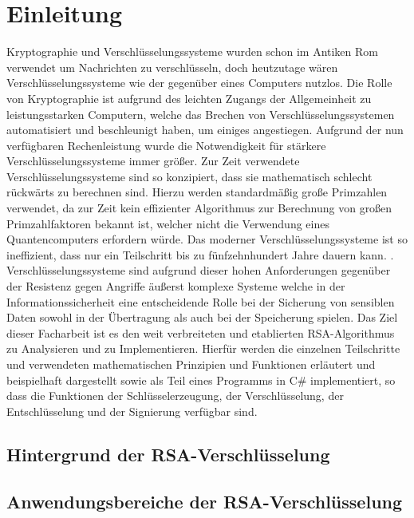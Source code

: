 \chapter{Einleitung}

Kryptographie und Verschlüsselungssysteme wurden schon im Antiken Rom verwendet um Nachrichten zu verschlüsseln\cite{aichner22}, doch heutzutage wären Verschlüsselungssysteme wie der  gegenüber eines Computers nutzlos.
Die Rolle von Kryptographie ist aufgrund des leichten Zugangs der Allgemeinheit zu leistungsstarken Computern, welche das Brechen von  Verschlüsselungssystemen automatisiert und beschleunigt haben, um einiges angestiegen.
Aufgrund der nun verfügbaren Rechenleistung wurde die Notwendigkeit für stärkere Verschlüsselungssysteme immer größer. Zur Zeit verwendete Verschlüsselungssysteme sind so konzipiert, dass sie mathematisch schlecht rückwärts zu berechnen sind.
Hierzu werden standardmäßig große Primzahlen verwendet, da zur Zeit kein effizienter Algorithmus zur Berechnung von großen Primzahlfaktoren bekannt ist, welcher nicht die Verwendung eines Quantencomputers erfordern würde.
Das  moderner Verschlüsselungssysteme ist so ineffizient, dass nur ein Teilschritt bis zu fünfzehnhundert Jahre dauern kann\cite{kleinjung10}.
\cite{kleinjung10}.
Verschlüsselungssysteme sind aufgrund dieser hohen Anforderungen gegenüber der Resistenz gegen Angriffe äußerst komplexe Systeme welche in der Informationssicherheit eine entscheidende Rolle bei der Sicherung von sensiblen Daten sowohl in der Übertragung als auch bei der Speicherung spielen\cite{aichner22}.
Das Ziel dieser Facharbeit ist es den weit verbreiteten und etablierten RSA-Algorithmus zu Analysieren und zu Implementieren. Hierfür werden die einzelnen Teilschritte und verwendeten mathematischen Prinzipien und Funktionen erläutert und beispielhaft dargestellt sowie als Teil eines Programms in C\# implementiert, so dass die Funktionen der Schlüsselerzeugung, der Verschlüsselung, der Entschlüsselung und der Signierung verfügbar sind.
\newpage

\section{Hintergrund der RSA-Verschlüsselung}

\newpage
\section{Anwendungsbereiche der RSA-Verschlüsselung}
